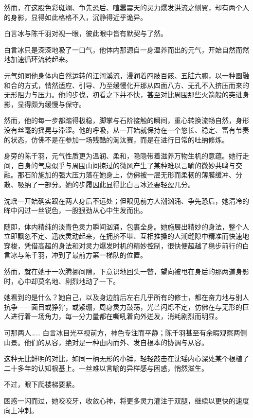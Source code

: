 然而，在这股色彩斑斓、争先恐后、喧嚣震天的灵力爆发洪流之侧翼，却有两个人的身影，显得如此格格不入，沉静得近乎诡异。

白言冰与陈千羽对视一眼，彼此眼中皆有默契与了然。

白言冰只是深深地吸了一口气，他体内那源自一身温养而出的元气，开始自然而然地加速循环流转起来。

元气如同他身体内自然运转的江河溪流，浸润着四肢百骸、五脏六腑，以一种圆融和合的方式，悄然适应、引导、乃至缓慢化开那从四面八方、无孔不入挤压而来的无形阻力与压力。他的步伐，初看之下并不快，甚至对比周围那些火箭般的突进身影，显得颇为缓慢与保守。

然而，他的每一步都踏得极稳，脚掌与石阶接触的瞬间，重心转换流畅自然，身形没有丝毫的摇晃与滞涩。他的呼吸，从一开始就保持在一个悠长、稳定、富有节奏的状态，仿佛不是在参加一场残酷的淘汰赛，而是在进行日常的吐纳修炼。

身旁的陈千羽，元气性质更为温润、柔和，隐隐带着滋养万物生机的意蕴。她行走间，自身的气息似乎与周围山间掠过的微风产生了某种难以言喻的微妙共鸣与交融。那石阶施加的强大压力落在她身上，仿佛被一层无形而柔韧的薄膜缓冲、分散、吸纳了一部分。她的步履因此显得比白言冰还要轻盈几分。

\vspace{2em}

沈瑶一开始确实跟在两人身后不远处；但眼见前方人潮汹涌、争先恐后，她清冷的眸中闪过一丝锐色，一股狠劲从心中生发而出。

随即，体内精纯的淡青色灵力瞬间汹涌，包裹全身。她施展出精妙的身法，整个人立即飘忽不定、迅疾灵动起来，在拥挤不堪、互相推搡的人潮缝隙中精准而快速地穿梭，凭借高超的身法和对灵力爆发时机的精妙控制，很快便超越了稳步前行的白言冰与陈千羽，冲到了最前方第一梯队的位置。

然而，就在她于一次腾挪间隙，下意识地回头一瞥，望向被甩在身后的那两道身影时，心中却莫名地、剧烈地动了一下。

她看到的是什么？她自己，以及身边前后左右几乎所有的修士，都在奋力地与别人抗争——面目或狰狞，或紧绷，周身灵力鼓荡，光芒闪烁不定，仿佛在与无形的巨人进行着一场角力，每一分力量都在嘶吼着向外迸发，消耗剧烈而明显。

可那两人…… 白言冰目光平视前方，神色专注而平静；陈千羽甚至有余暇观察两侧山景。他们的从容，绝对是一种由内而外、发自根本的协调与从容。

这种无比鲜明的对比，如同一柄无形的小锤，轻轻敲击在沈瑶内心深处某个根植了二十多年的认知根基上。一丝难以言喻的异样感与困惑，悄然滋生。

不过，眼下爬楼梯要紧。

困惑一闪而过，她咬咬牙，收敛心神，将更多灵力灌注于双腿，继续以更快的速度向上冲刺。

